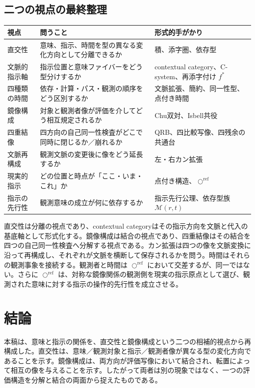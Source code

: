\documentclass[a4paper,11pt]{ltjsarticle}
\theoremstyle{definition}
\theoremstyle{plain}
\newcommand{\CircleRef}{\bigcirc^{\mathrm{ref}}}
\begin{document}
\subsection{二つの視点の最終整理}

\begin{center}
\begin{tabular}{p{} p{} p{}}
\toprule
視点 & 問うこと & 形式的手がかり \\
\midrule
直交性 & 意味、指示、時間を型の異なる変化方向として分離できるか & 積、添字圏、依存型 \\
文脈的指示軸 & 指示位置と意味ファイバーをどう型分けするか & contextual category、C-system、再添字付け $f^*$ \\
四種類の時間 & 依存・計算・パス・観測の順序をどう区別するか & 文脈拡張、簡約、同一性型、点付き時間 \\
鏡像構成 & 対象と観測者像が評価を介してどう相互規定されるか & Chu双対、Isbell共役 \\
四重結像 & 四方向の自己同一性検査がどこで同時に閉じるか／崩れるか & QRB、四比較写像、四残余の共通台 \\
文脈再構成 & 観測文脈の変更後に像をどう延長するか & 左・右カン拡張 \\
現実的指示 & どの位置と時点が「ここ・いま・これ」か & 点付き構造、$\CircleRef$ \\
指示の先行性 & 観測意味の成立が何に依存するか & 指示先行公理、依存型族 $\mathcal M(r,t)$ \\
\bottomrule
\end{tabular}
\end{center}

直交性は分離の視点であり、contextual categoryはその指示方向を文脈と代入の基底軸として形式化する。鏡像構成は結合の視点であり、四重結像はその結合を四つの自己同一性検査へ分解する視点である。カン拡張は四つの像を文脈変換に沿って再構成し、それぞれが文脈を横断して保存されるかを問う。時間はそれらの観測事象を接続する。観測者と時間は $\CircleRef$ において交差するが、同一ではない。さらに $\CircleRef$ は、対称な鏡像関係の観測側を現実の指示原点として選び、観測された意味に対する指示の操作的先行性を成立させる。

\section{結論}

本稿は、意味と指示の関係を、直交性と鏡像構成という二つの相補的視点から再構成した。直交性は、意味／観測対象と指示／観測者像が異なる型の変化方向であることを示す。鏡像構成は、両方向が評価写像において結合され、転置によって相互の像を与えることを示す。したがって両者は別の現象ではなく、一つの評価構造を分解と結合の両面から捉えたものである。
\end{document}
